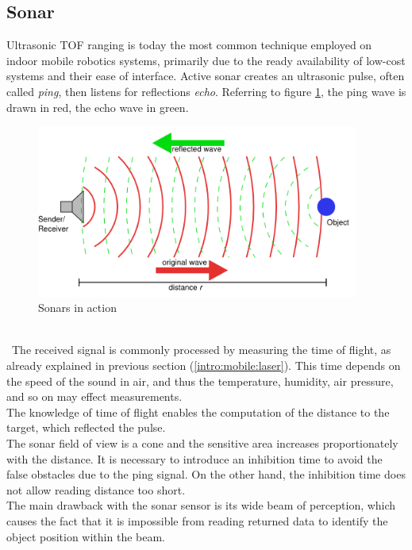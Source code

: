 \subsection{Sonar}
\label{intro:mobile:sonar}

Ultrasonic TOF ranging is today the most common technique employed
on indoor mobile robotics systems, primarily due to the ready
availability of low-cost systems and their ease of interface.
Active sonar creates an ultrasonic pulse, often called \textit{ping},
then listens for reflections \textit{echo}. Referring to figure
\ref{fig:sonar}, the ping wave is drawn in red, the echo wave
in green.
\begin{figure} [!h]
  \begin{center}
    \includegraphics[width=300pt]{img/sonar.png}
    \caption{Sonars in action}
    \label{fig:sonar}
  \end{center}
\end{figure}
\\\
The received signal is commonly processed by measuring the time of flight,
as already explained in previous section (\ref{intro:mobile:laser}).
This time depends on the speed of the sound in air, and thus the
temperature, humidity, air pressure, and so on may effect measurements.
\\
The knowledge of time of flight enables the computation of the distance
to the target, which reflected the pulse.
\\
The sonar field of view is a cone and the sensitive area increases
proportionately with the distance. It is necessary to introduce an
inhibition time to avoid the false obstacles due to the ping signal.
On the other hand, the inhibition time does not allow reading
distance too short.
\\
The main drawback with the sonar sensor is its wide beam of perception, which
causes the fact that it is impossible from reading returned data to identify
the object position within the beam.
\\
